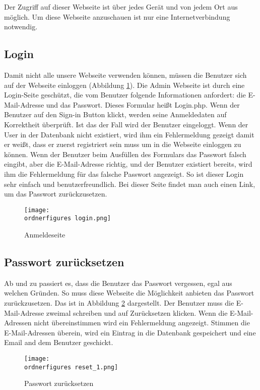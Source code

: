 Der Zugriff auf dieser Webseite ist \"uber jedes Ger\"{a}t und von jedem Ort aus m\"{o}glich. Um diese Webseite anzuschauen ist nur eine Internetverbindung notwendig.

\subsection{Login}
Damit nicht alle unsere Webseite verwenden können, müssen die Benutzer sich auf der Webseite einloggen (Abbildung \ref{fi:login}). Die Admin Webseite ist durch eine Login-Seite geschützt, die vom Benutzer folgende Informationen anfordert: die E-Mail-Adresse und das Passwort. Dieses Formular heißt Login.php. Wenn der Benutzer auf den Sign-in Button klickt, werden seine Anmeldedaten auf Korrektheit überprüft. Ist das der Fall wird der Benutzer eingeloggt. Wenn der User in der Datenbank nicht existiert, wird ihm ein Fehlermeldung gezeigt damit er weißt, dass er zuerst registriert sein muss um in die Webseite einloggen zu können. Wenn der Benutzer beim Ausfüllen des Formulars das Passwort falsch eingibt, aber die E-Mail-Adresse richtig, und der Benutzer existiert bereits, wird ihm die Fehlermeldung für das falsche Passwort angezeigt. So ist dieser Login sehr einfach und benutzerfreundlich. Bei dieser Seite findet man auch einen Link, um das Passwort zurückzusetzen.

\begin{figure}[H]
	\centering
	\texttt{[image: \\ordnerfigures login.png]}
	\caption{Anmeldeseite}
	\label{fi:login}
\end{figure}

\subsection{Passwort zurücksetzen}
Ab und zu passiert es, dass die Benutzer das Passwort vergessen, egal aus welchen Gründen. So muss diese Webseite die Möglichkeit anbieten das Passwort zurückzusetzen. Das ist in Abbildung \ref{fi:reset} dargestellt. Der Benutzer muss die E-Mail-Adresse zweimal schreiben und auf Zurücksetzen klicken. Wenn die E-Mail-Adressen nicht übereinstimmen wird ein Fehlermeldung angezeigt. Stimmen die E-Mail-Adressen überein, wird ein Eintrag in die Datenbank gespeichert und eine Email and dem Benutzer geschickt.
\begin{figure}[H]
	\centering
	\texttt{[image: \\ordnerfigures reset\_1.png]}
	\caption{Passwort zurücksetzen}
	\label{fi:reset}
\end{figure}

